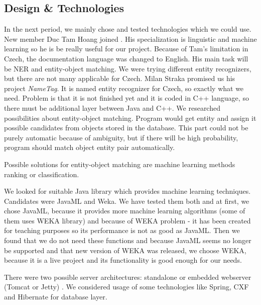 \subsection{Design \& Technologies}
In the next period, we mainly chose and tested technologies which we could use.
New member Duc Tam Hoang joined \textan{}. His specialization is linguistic and
machine learning so he is be really useful for our project. Because of Tam's
limitation in Czech, the documentation language was changed to English. His main
task will be NER and entity-object matching. We were trying different
entity recognizers, but there are not many applicable for Czech. Milan Straka
promised us his project \emph{NameTag}. It is named entity recognizer for Czech,
so exactly what we need. Problem is that it is not finished yet and it is coded
in C++ language, so there must be additional layer between Java and C++.
We researched possibilities about entity-object matching. Program would get
entity and assign it possible candidates from objects stored in the database.
This part could not be purely automatic because of ambiguity, but if there will
be high probability, program should match object entity pair automatically.

Possible solutions for entity-object matching are machine learning methods
ranking or classification.

We looked for suitable Java library which provides machine learning techniques.
Candidates were JavaML and Weka. We have tested them both and at first, we chose
JavaML, because it provides more machine learning algorithms (some of them uses
WEKA library) and because of WEKA problem - it has been created for teaching
purposes so its performance is not as good as JavaML. Then we found that we
do not need these functions and because JavaML seems no longer be supported and
that new version of WEKA was released, we choose WEKA, because it is a live
project and its functionality is good enough for our needs.

There were two possible server architectures: standalone or embedded webserver
(Tomcat or Jetty) . We considered usage of some technologies like Spring, CXF and
Hibernate for database layer.

